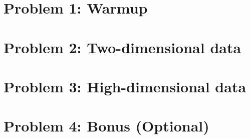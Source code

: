 \documentclass[11pt,letterpaper]{article}
\begin{document}
\section*{Problem 1: Warmup}

\newpage
\null\newpage

\section*{Problem 2: Two-dimensional data}

\newpage
\null\newpage

\section*{Problem 3: High-dimensional data}

\newpage
\null\newpage 

\section*{Problem 4: Bonus (Optional)}

\newpage
\null\newpage
\end{document}
